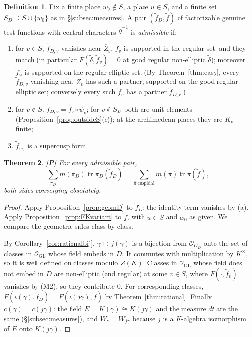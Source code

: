 \documentclass[12pt]{article}
\newcommand{\ov}[1]{\overline{#1}}
\newcommand{\tr}{\operatorname{tr}}
\newcommand{\GL}{\mathrm{GL}}
\newcommand{\Zb}{\ov{Z}}
\newcommand{\pib}{\ov{\pi}}
\newcommand{\Pv}{\textbf{[P]}}
\theoremstyle{plain}
\newtheorem{theorem}{Theorem}[section]
\theoremstyle{definition}
\newtheorem{definition}[theorem]{Definition}
\begin{document}
\begin{definition}\label{def:globalpairs}
Fix a finite place $w_0\notin S$, a place $u\in S$, and a finite set $S_D\supseteq S\cup\{w_0\}$ as in \S\ref{subsec:measures}. A pair $(\tilde f_D,\tilde f)$ of factorizable genuine test functions with central characters $\tilde\theta^{-1}$ is \emph{admissible} if:
\begin{enumerate}[label=(\alph*)]
\item for $v\in S$, $\tilde f_{D,v}$ vanishes near $\Zb_v$, $\tilde f_v$ is supported in the regular set, and they match (in particular $F(\tilde\delta,\tilde f_v)=0$ at good regular non-elliptic $\tilde\delta$); moreover $\tilde f_u$ is supported on the regular elliptic set. (By Theorem~\ref{thm:easy}, every $\tilde f_{D,v}$ vanishing near $\Zb_v$ has such a partner, supported on the good regular elliptic set; conversely every such $\tilde f_v$ has a partner $\tilde f_{D,v}$.)
\item for $v\notin S$, $\tilde f_{D,v}=\tilde f_v\circ\psi_v$; for $v\notin S_D$ both are unit elements (Proposition~\ref{prop:outsideS}(c)); at the archimedean places they are $K_v$-finite;
\item $\tilde f_{w_0}$ is a supercusp form.
\end{enumerate}
\end{definition}

\begin{theorem}\label{thm:comparison}\Pv
For every admissible pair,
\[ \sum_{\pib_D}m(\pib_D)\tr\pib_D(\tilde f_D)=\sum_{\pib\ \mathrm{cuspidal}}m(\pib)\tr\pib(\tilde f), \]
both sides converging absolutely.
\end{theorem}

\begin{proof}
Apply Proposition~\ref{prop:geomD} to $\tilde f_D$; the identity term vanishes by (a). Apply Proposition~\ref{prop:FKvariant} to $\tilde f$, with $u\in S$ and $w_0$ as given. We compare the geometric sides class by class.

By Corollary~\ref{cor:rationalbij}, $\gamma\mapsto j(\gamma)$ is a bijection from $\mathcal O_{G_D}$ onto the set of classes in $\mathcal O_{\GL}$ whose field embeds in $D$. It commutes with multiplication by $K^\times$, so it is well defined on classes modulo $Z(K)$. Classes in $\mathcal O_{\GL}$ whose field does not embed in $D$ are non-elliptic (and regular) at some $v\in S$, where $F(\cdot,\tilde f_v)$ vanishes by (M2), so they contribute $0$. For corresponding classes, $F(\iota(\gamma),\tilde f_D)=F(\iota(j\gamma),\tilde f)$ by Theorem~\ref{thm:rational}. Finally $c(\gamma)=c(j\gamma)$: the field $E=K(\gamma)\cong K(j\gamma)$ and the measure $dt$ are the same (\S\ref{subsec:measures}), and $W_\gamma=W_{j\gamma}$ because $j$ is a $K$-algebra isomorphism of $E$ onto $K(j\gamma)$.
\end{proof}
\end{document}
